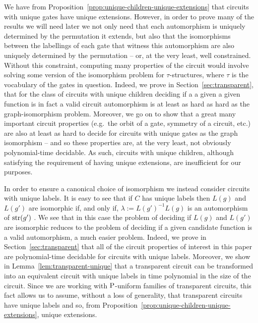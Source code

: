 \documentclass[../main/thesis.tex]{subfiles}
\begin{document}
We have from Proposition~\ref{prop:unique-children-unique-extensions} that
circuits with unique gates have unique extensions. However, in order to prove
many of the results we will need later we not only need that each automorphism
is uniquely determined by the permutation it extends, but also that the
isomorphisms between the labellings of each gate that witness this automorphism
are also uniquely determined by the permutation -- or, at the very least, well
constrained. Without this constraint, computing many properties of the circuit
would involve solving some version of the isomorphism problem for
$\tau$-structures, where $\tau$ is the vocabulary of the gates in question.
Indeed, we prove in Section~\ref{sec:transparent}, that for the class of
circuits with unique children deciding if a a given a given function is in fact
a valid circuit automorphism is at least as hard as hard as the
graph-isomorphism problem. Moreover, we go on to show that a great many
important circuit properties (e.g.\ the orbit of a gate, symmetry of a circuit,
etc.) are also at least as hard to decide for circuits with unique gates as the
graph isomorphism -- and so these properties are, at the very least, not
obviously polynomial-time decidable. As such, circuits with unique children,
although satisfying the requirement of having unique extensions, are
insufficient for our purposes.

In order to ensure a canonical choice of isomorphism we instead consider
circuits with unique labels. It is easy to see that if $C$ has unique labels
then $L(g)$ and $L(g')$ are isomorphic if, and only if, $\lambda :=
L(g')^{-1}L(g)$ is an automorphism of $\text{str}(g')$ . We see that in this case the
problem of deciding if $L(g)$ and $L(g')$ are isomorphic reduces to the problem
of deciding if a given candidate function is a valid automorphism, a much easier
problem. Indeed, we prove in Section~\ref{sec:transparent} that all of the
circuit properties of interest in this paper are polynomial-time decidable for
circuits with unique labels. Moreover, we show in
Lemma~\ref{lem:transparent-unique} that a transparent circuit can be transformed
into an equivalent circuit with unique labels in time polynomial in the size of
the circuit. Since we are working with $\mathrm{P}$-uniform families of transparent
circuits, this fact allows us to assume, without a loss of generality, that
transparent circuits have unique labels and so, from
Proposition~\ref{prop:unique-children-unique-extensions}, unique extensions.
\end{document}
